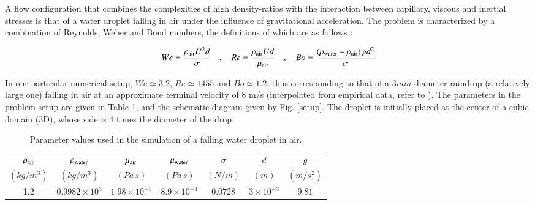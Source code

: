 
A flow configuration that combines the complexities of high density-ratios with the interaction between capillary, viscous and inertial stresses is that of a water droplet falling in air under the influence of gravitational acceleration. The problem is characterized by a combination of Reynolds, Weber and Bond numbers, the definitions of which are as follows : 

\begin{align}
We=\frac{\rho_{\rm air} U^2 d}{\sigma} \quad,\quad Re= \frac{\rho_{\rm air} U d}{\mu_{\rm air}} \quad,\quad Bo=\frac{\left(\rho_{\rm water}-\rho_{\rm air}\right) g d^2 }{\sigma}
\end{align}

\vspace*{0.2cm}

In our particular numerical setup, $We \simeq 3.2 $, $Re \simeq 1455 $ and $Bo \simeq 1.2 $, thus corresponding to that of a $3mm$ diameter raindrop (a relatively large one) falling in air at an approximate terminal velocity of  $8$ m/s (interpolated from empirical data, refer to  \cite{gunn1949terminal}). The parameters in the problem setup are given in Table \ref{raindropprop}, and the schematic diagram given by Fig. \ref{setup}. The droplet is initially placed at the center of a cubic domain (3D), whose side is 4 times the diameter of the drop. 

\vspace*{0.2cm}

\begin{table}[h!]
\begin{center}
\begin{tabular}{ccccccc}
\hline\hline
$\rho_{\rm air}$ & $\rho_{\rm water}$ & $\mu_{\rm air}$ 
& $\mu_{\rm water}$ & $\sigma$ & $d$ & $g$\\
$\left(kg/m^3\right)$ & $\left(kg/m^3\right)$ & $\left(Pa \, s\right)$ 
& $\left(Pa \,s \right)$ & $\left(N/m\right)$ & $(m)$ & $(m /s^{2})$ \\
\hline
1.2 & $0.9982 \times 10^3$ & $1.98 \times 10^{-5}$ & 
$8.9 \times 10^{-4}$ & $0.0728$ & $3 \times 10^{-3}$ & $9.81$\\
\hline\hline
\end{tabular}
\caption{Parameter values used in the simulation of a falling water droplet in air. \label{raindropprop}}
\end{center}
\end{table}

\vspace*{0.2cm}

